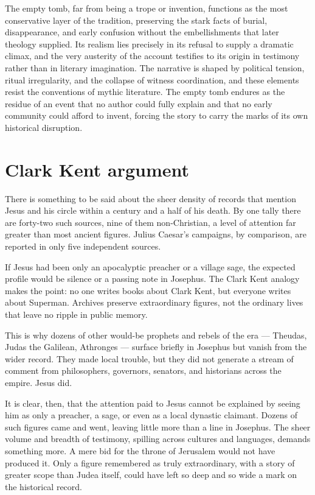 The empty tomb, far from being a trope or invention, functions as the most conservative layer of the tradition, preserving the stark facts of burial, disappearance, and early confusion without the embellishments that later theology supplied.
Its realism lies precisely in its refusal to supply a dramatic climax, and the very austerity of the account testifies to its origin in testimony rather than in literary imagination.
The narrative is shaped by political tension, ritual irregularity, and the collapse of witness coordination, and these elements resist the conventions of mythic literature.
The empty tomb endures as the residue of an event that no author could fully explain and that no early community could afford to invent, forcing the story to carry the marks of its own historical disruption.

\section{Clark Kent argument}\label{sec:clark-kent-argument}

There is something to be said about the sheer density of records that mention Jesus and his circle within a century and a half of his death.
By one tally there are forty-two such sources, nine of them non-Christian, a level of attention far greater than most ancient figures.
Julius Caesar’s campaigns, by comparison, are reported in only five independent sources.

If Jesus had been only an apocalyptic preacher or a village sage, the expected profile would be silence or a passing note in Josephus.
The Clark Kent analogy makes the point: no one writes books about Clark Kent, but everyone writes about Superman.
Archives preserve extraordinary figures, not the ordinary lives that leave no ripple in public memory.

This is why dozens of other would-be prophets and rebels of the era --- Theudas, Judas the Galilean, Athronges --- surface briefly in Josephus \cite[20.97--98]{josephus:ant} but vanish from the wider record.
They made local trouble, but they did not generate a stream of comment from philosophers, governors, senators, and historians across the empire.
Jesus did.

It is clear, then, that the attention paid to Jesus cannot be explained by seeing him as only a preacher, a sage, or even as a local dynastic claimant.
Dozens of such figures came and went, leaving little more than a line in Josephus.
The sheer volume and breadth of testimony, spilling across cultures and languages, demands something more.
A mere bid for the throne of Jerusalem would not have produced it.
Only a figure remembered as truly extraordinary, with a story of greater scope than Judea itself, could have left so deep and so wide a mark on the historical record.
